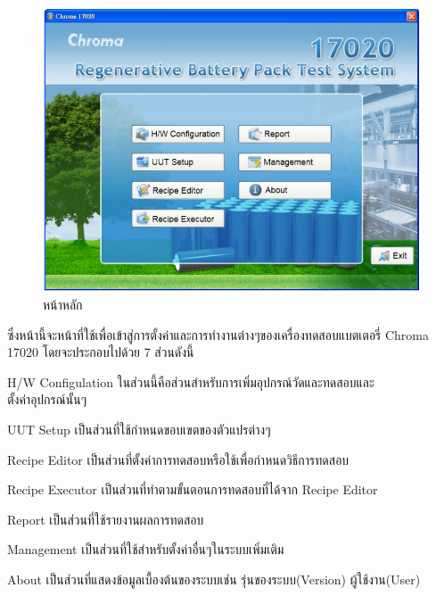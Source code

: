 \begin{center}
	\begin{figure}[H]
		\includegraphics[width=1\linewidth]{Chapters/img/17020_Program/Home.png}
		\centering
		\captionsetup{justification=centering,margin=2cm}
		\caption{หน้าหลัก}
	\end{figure}
\end{center}
ซึ่งหน้านี้จะหน้าที่ใช้เพื่อเข้าสู่การตั้งค่าและการทำงานต่างๆของเครื่องทดสอบแบตเตอรี่ Chroma 17020 โดยจะประกอบไปด้วย 7 ส่วนดังนี้
\begin{itemize}
{\item H/W Configulation ในส่วนนี้คือส่วนสำหรับการเพิ่มอุปกรณ์วัดและทดสอบและ\\ตั้งค่าอุปกรณ์นั้นๆ}
{\item UUT Setup เป็นส่วนที่ใช้กำหนดขอบเขตของตัวแปรต่างๆ}
{\item Recipe Editor เป็นส่วนที่ตั้งค่าการทดสอบหรือใช้เพื่อกำหนดวิธีการทดสอบ}
{\item Recipe Executor เป็นส่วนที่ทำตามขั้นตอนการทดสอบที่ได้จาก Recipe Editor}
{\item Report เป็นส่วนที่ใช้รายงานผลการทดสอบ}
{\item Management เป็นส่วนที่ใช้สำหรับตั้งค่าอื่นๆในระบบเพิ่มเติม}
{\item About เป็นส่วนที่แสดงข้อมูลเบื้องต้นของระบบเช่น รุ่นของระบบ(Version) ผู้ใช้งาน(User)}
\end{itemize}
